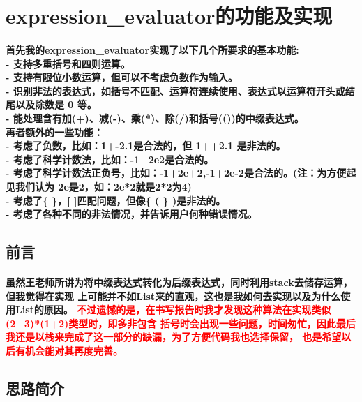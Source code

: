 \documentclass[UTF8]{ctexart}
\begin{document}
\pagestyle{fancy}
\fancyhead{}
\setlength{\headheight}{12.64723pt}

\section{expression\_evaluator的功能及实现}

\paragraph{
首先我的expression\_evaluator实现了以下几个所要求的基本功能: \\
- 支持多重括号和四则运算。\\
- 支持有限位小数运算，但可以不考虑负数作为输入。\\
- 识别非法的表达式，如括号不匹配、运算符连续使用、表达式以运算符开头或结尾以及除数是 0 等。\\
- 能处理含有加(+)、减(-)、乘(*)、除(/)和括号(())的中缀表达式。\\
再者额外的一些功能：\\
- 考虑了负数，比如：1+-2.1是合法的，但 1++2.1 是非法的。\\
- 考虑了科学计数法，比如：-1+2e2是合法的。\\
- 考虑了科学计数法正负号，比如：-1+2e+2,-1+2e-2是合法的。(注：为方便起见我们认为
2e是2，如：2e*2就是2*2为4)\\
- 考虑了\{ \}，[ ]匹配问题，但像\{ ( \} )是非法的。\\
- 考虑了各种不同的非法情况，并告诉用户何种错误情况。\\
}
\subsection{前言}
\paragraph{\hspace{2em}
虽然王老师所讲为将中缀表达式转化为后缀表达式，同时利用stack去储存运算，但我觉得在实现
上可能并不如List来的直观，这也是我如何去实现以及为什么使用List的原因。
\textcolor{red}{不过遗憾的是，在书写报告时我才发现这种算法在实现类似(2+3)*(1+2)类型时，即多非包含
括号时会出现一些问题，时间匆忙，因此最后我还是以栈来完成了这一部分的缺漏，为了方便代码我也选择保留，
也是希望以后有机会能对其再度完善。}
}
\subsection{思路简介}
\end{document}
